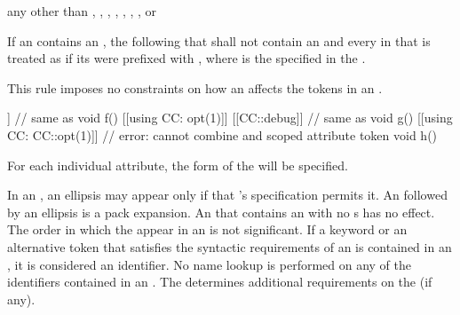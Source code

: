 \begin{bnf}
\br
    \terminal{(}  \terminal{)}\br
    \terminal{[}  \terminal{]}\br
    \terminal{\{}  \terminal{\}}\br
    \terminal{[:}  \terminal{:]}\br
    \textnormal{any  other than \terminal{(}, \terminal{)}, \terminal{[}, \terminal{]}, \terminal{\{}, \terminal{\}}, \terminal{[:}, or \terminal{:]}}
\end{bnf}

\pnum
If an 
contains an ,
the  following that 
shall not contain an 
and every  in that 
is treated as if
its  were prefixed with ,
where  is the 
specified in the .
\begin{note}
This rule imposes no constraints on how
an 
affects the tokens in an .
\end{note}
\begin{example}
\begin{codeblock}
[[using CC: opt(1), debug]]         // same as 
  void f() {}
[[using CC: opt(1)]] [[CC::debug]]  // same as \tcode{[[CC::opt(1)]] [[CC::debug]]}
  void g() {}
[[using CC: CC::opt(1)]]            // error: cannot combine  and scoped attribute token
  void h() {}
\end{codeblock}
\end{example}

\pnum
\begin{note}
For each individual attribute, the form of the
 will be specified.
\end{note}

\pnum
In an , an ellipsis may appear only if that
's specification permits it. An  followed
by an ellipsis is a pack expansion.
An  that contains
an  with no s
has no effect.
The order in which the  appear in an
 is not significant. If a
keyword
or an alternative token that satisfies the syntactic requirements
of an  is
contained in
an , it is considered an identifier. No name
lookup is performed on any of the identifiers contained in an
. The  determines additional
requirements on the  (if any).

